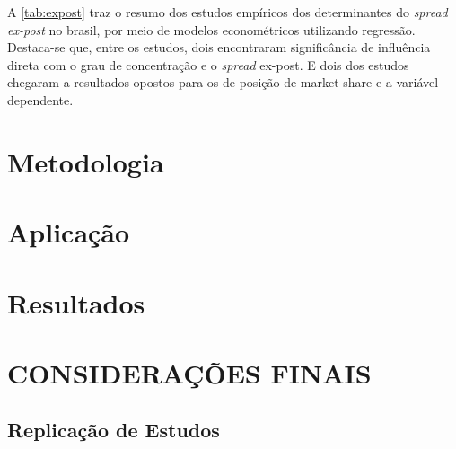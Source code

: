 \documentclass[12pt,openright,oneside,a4paper,chapter=TITLE,section=TITLE,subsection=Title,english,french,spanish,portugues,sumario=tradicional]{04-class-files/abntex2}
\begin{document}
A \autoref{tab:expost} traz o resumo dos estudos empíricos dos determinantes do
\emph{spread ex-post} no brasil, por meio de modelos econométricos utilizando
regressão. Destaca-se que, entre os estudos, dois encontraram significância de
influência direta com o grau de concentração e o \emph{spread} ex-post. E dois dos
estudos chegaram a resultados opostos para os de posição de market share e a variável dependente.

\chapter{Metodologia}

\chapter{Aplicação}

\chapter{Resultados}


\chapter*[Conclusão]{CONSIDERAÇÕES FINAIS}

\postextual


\postextual


{\begin{apendicesenv}

\renewcommand{\thechapter}{\arabic{chapter}}

\chapter{Replicação de Estudos}
\section{}
 
\end{apendicesenv}
}{}



\printbibliography
\end{document}
